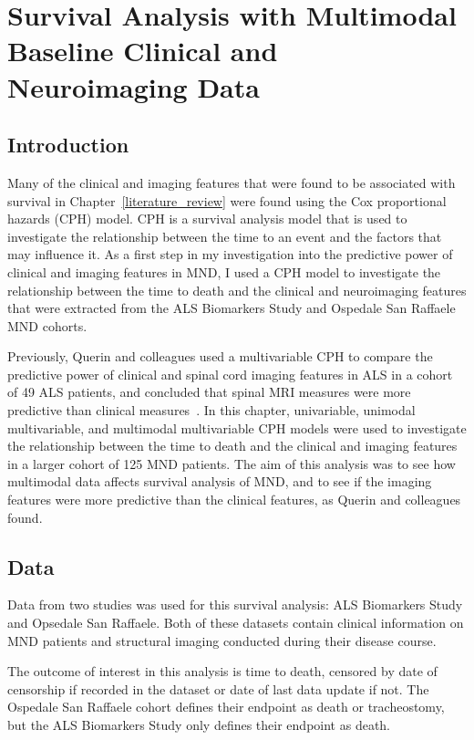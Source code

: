 \chapter{Survival Analysis with Multimodal Baseline Clinical and Neuroimaging Data}
\label{cox_proportional_hazards_model}

\section{Introduction}

Many of the clinical and imaging features that were found to be associated with survival in Chapter~\ref{literature_review} were found using the Cox proportional hazards (CPH) model.
CPH is a survival analysis model that is used to investigate the relationship between the time to an event and the factors that may influence it.
As a first step in my investigation into the predictive power of clinical and imaging features in MND, I used a CPH model to investigate the relationship between the time to death and the clinical and neuroimaging features that were extracted from the ALS Biomarkers Study and Ospedale San Raffaele MND cohorts.

Previously, Querin and colleagues used a multivariable CPH to compare the predictive power of clinical and spinal cord imaging features in ALS in a cohort of 49 ALS patients, and concluded that spinal MRI measures were more predictive than clinical measures~\cite{querinSpinalCordMultiparametric2017}.
In this chapter, univariable, unimodal multivariable, and multimodal multivariable CPH models were used to investigate the relationship between the time to death and the clinical and imaging features in a larger cohort of 125 MND patients.
The aim of this analysis was to see how multimodal data affects survival analysis of MND, and to see if the imaging features were more predictive than the clinical features, as Querin and colleagues found.

\section{Data}

Data from two studies was used for this survival analysis: ALS Biomarkers Study and Opsedale San Raffaele.
Both of these datasets contain clinical information on MND patients and structural imaging conducted during their disease course.

The outcome of interest in this analysis is time to death, censored by date of censorship if recorded in the dataset or date of last data update if not.
The Ospedale San Raffaele cohort defines their endpoint as death or tracheostomy, but the ALS Biomarkers Study only defines their endpoint as death.

